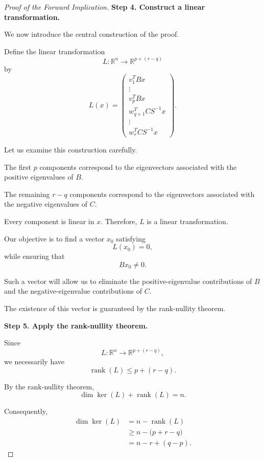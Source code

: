 \documentclass[11pt]{article}
\theoremstyle{definition}
\theoremstyle{remark}
\begin{document}
\begin{proof}[Proof of the Forward Implication]
\medskip

\textbf{Step 4. Construct a linear transformation.}

We now introduce the central construction
of the proof.

Define the linear transformation
\[
    L:\mathbb{R}^n
    \longrightarrow
    \mathbb{R}^{p+(r-q)}
\]
by
\[
    \boxed{
    L(x)=
    \begin{pmatrix}
        v_1^TBx\\
        \vdots\\
        v_p^TBx\\
        w_{q+1}^TCS^{-1}x\\
        \vdots\\
        w_r^TCS^{-1}x
    \end{pmatrix}.
    }
\]


Let us examine this construction carefully.

The first $p$ components correspond to
the eigenvectors associated with the
positive eigenvalues of $B$.

The remaining $r-q$ components correspond
to the eigenvectors associated with the
negative eigenvalues of $C$.

Every component is linear in $x$.
Therefore, $L$ is a linear transformation.

Our objective is to find a vector
$x_0$ satisfying
\[
    L(x_0)=0,
\]
while ensuring that
\[
    Bx_0\neq 0.
\]

Such a vector will allow us to eliminate
the positive-eigenvalue contributions
of $B$ and the negative-eigenvalue
contributions of $C$.

The existence of this vector is guaranteed
by the rank-nullity theorem.

\medskip

\textbf{Step 5. Apply the rank-nullity theorem.}

Since
\[
    L:\mathbb{R}^n
    \longrightarrow
    \mathbb{R}^{p+(r-q)},
\]
we necessarily have
\[
    \operatorname{rank}(L)\leq p+(r-q).
\]

By the rank-nullity theorem,
\[
    \dim\ker(L)
    +\operatorname{rank}(L)=n.
\]

Consequently,
\[
\begin{aligned}
    \dim\ker(L)
    &=n-\operatorname{rank}(L)\\
    &\geq n-\bigl(p+r-q\bigr)\\
    &=n-r+(q-p).
\end{aligned}
\]


\end{proof}
\end{document}
